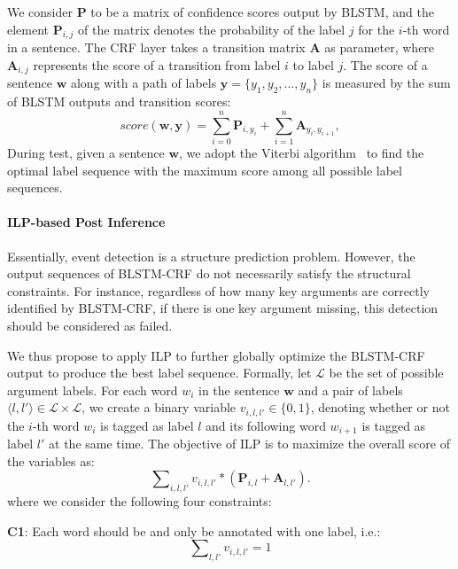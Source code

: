 We consider $\textbf{P}$ to be a matrix of confidence scores output by BLSTM, and the element $\textbf{P}_{i,j}$ of the matrix denotes the probability of the label $j$ for the $i$-th word in a sentence. The CRF layer takes a transition matrix $\textbf{A}$ as parameter, where $\textbf{A}_{i,j}$ represents the score of a transition from label $i$ to label $j$. The score of a sentence $\bm{w}$ along with a path of labels $\bm{y} = \{y_1, y_2, \ldots, y_n\}$ is measured by the sum of BLSTM outputs and transition scores:
\begin{equation}
	score(\bm{w}, \bm{y}) = \sum\limits_{i=0}^n\textbf{P}_{i, y_i} + \sum\limits_{i=1}^n\textbf{A}_{y_i, y_{i+1}},
\end{equation}
During test, given a sentence $\bm{w}$, we adopt the Viterbi algorithm~\cite{rabiner1989tutorial} to find the optimal label sequence with the maximum score among all possible label sequences.

\paragraph{ILP-based Post Inference}
Essentially, event detection is a structure prediction problem. However, the output sequences of BLSTM-CRF do not necessarily satisfy the
structural constraints. For instance, regardless of how many key arguments are correctly identified by BLSTM-CRF, if there is one key
argument missing, this detection should be considered as failed.

We thus propose to apply ILP to further globally optimize the BLSTM-CRF output  to produce the best label sequence. Formally, let
$\mathcal{L}$ be the set of possible argument labels. For each word $w_i$ in the sentence $\bm{w}$ and a pair of labels $ \langle l, l'
\rangle \in \mathcal{L} \times \mathcal{L}$, we create a binary variable ${v_{i,l,l'} \in \{0, 1\}}$, denoting whether or not the $i$-th
word $w_i$ is tagged as label $l$ and its following word $w_{i+1}$ is tagged as label $l'$ at the same time. The objective of ILP is to
maximize the overall score of the variables as:
\begin{displaymath}
	\sum\nolimits_{i, l, l'}v_{i,l,l'} * (\textbf{P}_{i,l}+\textbf{A}_{l,l'}) .
\end{displaymath}
where we consider the following four constraints:

\textbf{C1}: Each word should be and only be annotated with one label, i.e.:
\begin{equation}
	\sum\nolimits_{l,l'}v_{i,l,l'}=1
\end{equation}

